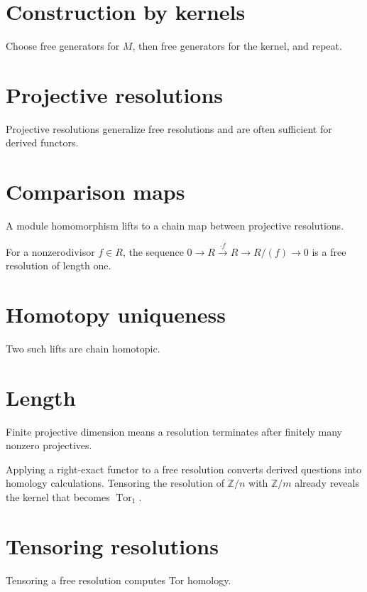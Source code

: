 \section{Construction by kernels}
Choose free generators for $M$, then free generators for the kernel, and repeat.

\section{Projective resolutions}
Projective resolutions generalize free resolutions and are often sufficient for derived functors.

\section{Comparison maps}
A module homomorphism lifts to a chain map between projective resolutions.

\begin{example}\label{ex:v23-expand-02}
For a nonzerodivisor $f\in R$, the sequence $0\to R\xrightarrow{\cdot f}R\to R/(f)\to0$ is a free resolution of length one.
\end{example}
\section{Homotopy uniqueness}
Two such lifts are chain homotopic.

\section{Length}
Finite projective dimension means a resolution terminates after finitely many nonzero projectives.

\begin{example}\label{ex:v23-expand-03}
Applying a right-exact functor to a free resolution converts derived questions into homology calculations. Tensoring the resolution of $\mathbb Z/n$ with $\mathbb Z/m$ already reveals the kernel that becomes $\operatorname{Tor}_1$.
\end{example}
\section{Tensoring resolutions}
Tensoring a free resolution computes Tor homology.

